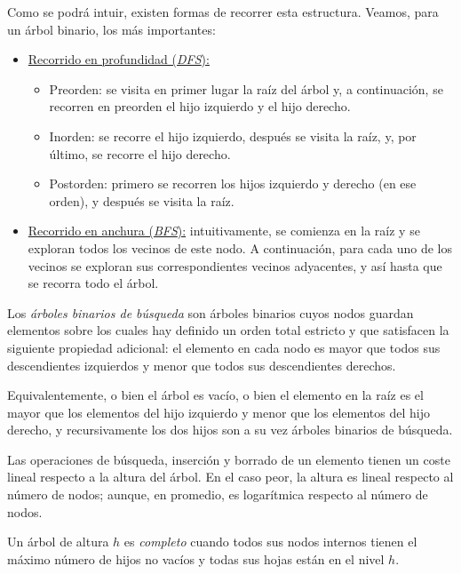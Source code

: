 Como se podrá intuir, existen formas de recorrer esta estructura. Veamos, para un árbol binario, los más importantes:
\begin{itemize}
	\item \underline{Recorrido en profundidad (\textit{DFS}):} 
	\begin{itemize}
		\item Preorden: se visita en primer lugar la raíz del árbol y, a continuación, se recorren en preorden el hijo izquierdo y el hijo derecho.
		\item Inorden: se recorre el hijo izquierdo, después se visita la raíz, y, por último, se recorre el hijo derecho.
		\item Postorden: primero se recorren los hijos izquierdo y derecho (en ese orden), y después se visita la raíz.
	\end{itemize}
	\item \underline{Recorrido en anchura (\textit{BFS}):} intuitivamente, se comienza en la raíz y se exploran todos los vecinos de este nodo. A continuación, para cada uno de los vecinos se exploran sus correspondientes vecinos adyacentes, y así hasta que se recorra todo el árbol.
\end{itemize}

\begin{defi}\label{def bin}
	Los \textit{árboles binarios de búsqueda} son árboles binarios cuyos nodos guardan elementos sobre los cuales hay definido un orden total estricto y que satisfacen la siguiente propiedad adicional: el elemento en cada nodo es mayor que todos sus descendientes izquierdos y menor que todos sus descendientes derechos.
\end{defi}

\begin{obs}
	Equivalentemente, o bien el árbol es vacío, o bien el elemento en la raíz es el mayor que los elementos del hijo izquierdo y menor que los elementos del hijo derecho, y recursivamente los dos hijos son a su vez árboles binarios de
	búsqueda.
\end{obs}

\begin{obs}
	Las operaciones de búsqueda, inserción y borrado de un elemento tienen un coste lineal respecto a la altura del árbol. En el caso peor, la altura es lineal respecto al número de nodos; aunque, en promedio, es logarítmica respecto al número de nodos.
\end{obs}

\begin{defi}\label{def completo}
	Un árbol de altura $h$ es \textit{completo} cuando todos sus nodos internos tienen el máximo número de hijos no vacíos y todas sus hojas están en el nivel $h$. 
\end{defi}


